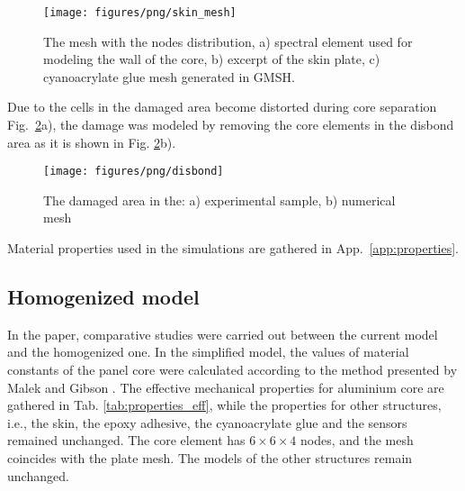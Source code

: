 \documentclass[sensors,article,submit,moreauthors,pdftex]{Definitions/mdpi}
\begin{document}
\begin{figure}
	\begin{center}
		\texttt{[image: figures/png/skin\_mesh]}
	\end{center}
	\caption{The mesh with the nodes distribution, a) spectral element used for modeling the wall of the core, b) excerpt of the skin plate, c) cyanoacrylate glue mesh generated in GMSH.}
	\label{fig:skin_mesh}
\end{figure}
Due to the cells in the damaged area become distorted during core separation Fig.~\ref{fig:disbond}a), the damage was modeled by removing the core elements in the disbond area as it is shown in Fig. \ref{fig:disbond}b).
\begin{figure}
	\begin{center}
		\texttt{[image: figures/png/disbond]}
	\end{center}
	\caption{The damaged area in the: a) experimental sample, b) numerical mesh}
	\label{fig:disbond}
\end{figure}
Material properties used in the simulations are gathered in App.~\ref{app:properties}.
\subsection{Homogenized model}
\label{sec:homogenization}
In the paper, comparative studies were carried out between the current model and the homogenized one. 
In the simplified model, the values of material constants of the panel core were calculated according to the method presented by Malek and Gibson \cite{malek2015effective}.
The effective mechanical properties for aluminium core are gathered in Tab. \ref{tab:properties_eff}, while the properties for other structures, i.e., the skin, the epoxy adhesive, the cyanoacrylate glue and the sensors remained unchanged.
The core element has \(6 \times 6 \times 4\) nodes, and the mesh coincides with the plate mesh. The models of the other structures remain unchanged.
\end{document}
